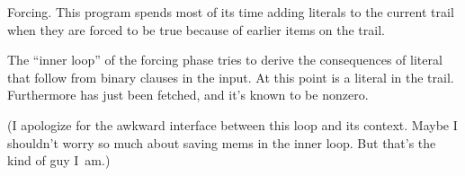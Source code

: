 Forcing. This program spends most of its time adding literals
to the current trail when they are forced to be true because of
earlier items on the trail.

The ``inner loop'' of the forcing phase tries to derive the
consequences of literal~ that follow from binary clauses in the
input. At this point  is a literal in the trail.
Furthermore 
has just been fetched, and it's known to be nonzero.

(I apologize for the awkward interface between this loop and its context.
Maybe I shouldn't worry so much about saving mems in the inner loop.
But that's the kind of guy I~am.)


